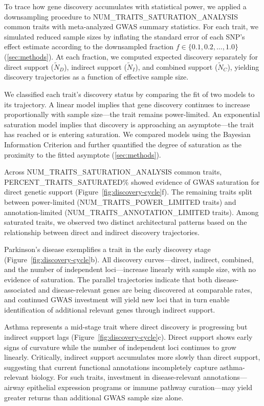 To trace how gene discovery accumulates with statistical power, we applied a downsampling procedure to {{NUM_TRAITS_SATURATION_ANALYSIS}} common traits with meta-analyzed GWAS summary statistics. For each trait, we simulated reduced sample sizes by inflating the standard error of each SNP's effect estimate according to the downsampled fraction $f \in \{0.1, 0.2, \ldots, 1.0\}$ (\ref{sec:methods}). At each fraction, we computed expected discovery separately for direct support ($\tilde{N}_D$), indirect support ($\tilde{N}_I$), and combined support ($\tilde{N}_C$), yielding discovery trajectories as a function of effective sample size.

We classified each trait's discovery status by comparing the fit of two models to its trajectory. A linear model implies that gene discovery continues to increase proportionally with sample size---the trait remains power-limited. An exponential saturation model implies that discovery is approaching an asymptote---the trait has reached or is entering saturation. We compared models using the Bayesian Information Criterion and further quantified the degree of saturation as the proximity to the fitted asymptote (\ref{sec:methods}).

Across {{NUM_TRAITS_SATURATION_ANALYSIS}} common traits, {{PERCENT_TRAITS_SATURATED}}\% showed evidence of GWAS saturation for direct genetic support (Figure~\ref{fig:discovery-cycle}f). The remaining traits split between power-limited ({{NUM_TRAITS_POWER_LIMITED}} traits) and annotation-limited ({{NUM_TRAITS_ANNOTATION_LIMITED}} traits). Among saturated traits, we observed two distinct architectural patterns based on the relationship between direct and indirect discovery trajectories.

Parkinson's disease exemplifies a trait in the early discovery stage (Figure~\ref{fig:discovery-cycle}b). All discovery curves---direct, indirect, combined, and the number of independent loci---increase linearly with sample size, with no evidence of saturation. The parallel trajectories indicate that both disease-associated and disease-relevant genes are being discovered at comparable rates, and continued GWAS investment will yield new loci that in turn enable identification of additional relevant genes through indirect support.

Asthma represents a mid-stage trait where direct discovery is progressing but indirect support lags (Figure~\ref{fig:discovery-cycle}c). Direct support shows early signs of curvature while the number of independent loci continues to grow linearly. Critically, indirect support accumulates more slowly than direct support, suggesting that current functional annotations incompletely capture asthma-relevant biology. For such traits, investment in disease-relevant annotations---airway epithelial expression programs or immune pathway curation---may yield greater returns than additional GWAS sample size alone.

